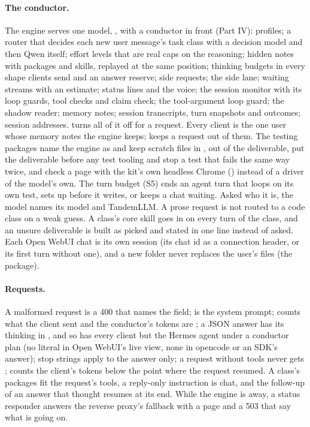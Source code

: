 \paragraph{The conductor.} The engine serves one model, , with a conductor in front (Part IV): profiles; a router that decides each new user message's task class with a decision model and then Qwen itself; effort levels that are real caps on the reasoning; hidden notes with packages and skills, replayed at the same position; thinking budgets in every shape clients send and an answer reserve; side requests; the side lane; waiting streams with an estimate; status lines and the voice; the session monitor with its loop guards, tool checks and claim check; the tool-argument loop guard; the shadow reader; memory notes; session transcripts, turn snapshots and outcomes; session addresses.  turns all of it off for a request. Every client is the one user whose memory notes the engine keeps;  keeps a request out of them. The testing packages name the engine as  and keep scratch files in , out of the deliverable, put the deliverable before any test tooling and stop a test that fails the same way twice, and check a page with the kit's own headless Chrome () instead of a driver of the model's own. The turn budget (S5) ends an agent turn that loops on its own test, sets up before it writes, or keeps a chat waiting. Asked who it is, the model names its model and TandemLLM. A prose request is not routed to a code class on a weak guess. A class's core skill goes in on every turn of the class, and an unsure deliverable is built as picked and stated in one line instead of asked. Each Open WebUI chat is its own session (its chat id as a connection header, or its first turn without one), and a new folder never replaces the user's files (the  package).

\paragraph{Requests.} A malformed request is a 400 that names the field;  is the system prompt;  counts what the client sent and the conductor's tokens are ; a JSON answer has its thinking in , and so has every client but the Hermes agent under a conductor plan (no literal  in Open WebUI's live view, none in opencode or an SDK's answer); stop strings apply to the answer only; a request without tools never gets ;  counts the client's tokens below the point where the request resumed. A class's packages fit the request's tools, a reply-only instruction is chat, and the follow-up of an answer that thought resumes at its end. While the engine is away, a status responder answers the reverse proxy's fallback with a page and a 503 that say what is going on.

